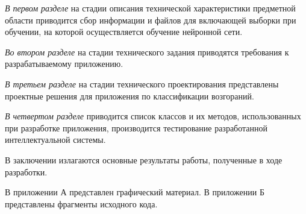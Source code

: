 \emph{В первом разделе} на стадии описания технической характеристики предметной области приводится сбор информации и файлов для включающей выборки при обучении, на которой осуществляется обучение нейронной сети.

\emph{Во втором разделе} на стадии технического задания приводятся требования к разрабатываемому приложению.

\emph{В третьем разделе} на стадии технического проектирования представлены проектные решения для приложения по классификации возгораний.

\emph{В четвертом разделе} приводится список классов и их методов, использованных при разработке приложения, производится тестирование разработанной интеллектуальной системы.

В заключении излагаются основные результаты работы, полученные в ходе разработки.

В приложении А представлен графический материал.
В приложении Б представлены фрагменты исходного кода. 
